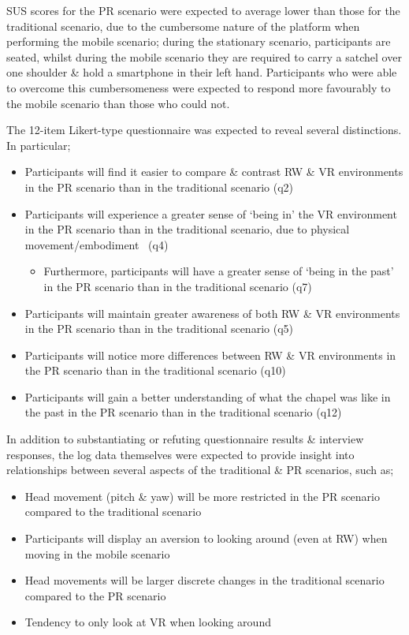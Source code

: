 SUS scores for the PR scenario were expected to average lower than those for the traditional scenario, due to the cumbersome nature of the platform when performing the mobile scenario; during the stationary scenario, participants are seated, whilst during the mobile scenario they are required to carry a satchel over one shoulder \& hold a smartphone in their left hand. Participants who were able to overcome this cumbersomeness were expected to respond more favourably to the mobile scenario than those who could not.

The 12-item Likert-type questionnaire was expected to reveal several distinctions. In particular;
\begin{itemize}
	\item Participants will find it easier to compare \& contrast RW \& VR environments in the PR scenario than in the traditional scenario (q2)
	\item Participants will experience a greater  sense of `being in' the VR environment in the PR scenario than in the traditional scenario, due to physical movement/embodiment~\cite{Groten2011} (q4)
	\begin{itemize}
		\item Furthermore, participants will have a greater sense of `being in the past' in the PR scenario than in the traditional scenario (q7)
	\end{itemize}
	\item Participants will maintain greater awareness of both RW \& VR environments in the PR scenario than in the traditional scenario (q5)
	\item Participants will notice more differences between RW \& VR environments in the PR scenario than in the traditional scenario (q10)	
	\item Participants will gain a better understanding of what the chapel was like in the past in the PR scenario than in the traditional scenario (q12)
\end{itemize}

In addition to substantiating or refuting questionnaire results \& interview responses, the log data themselves were expected to provide insight into relationships between several aspects of the traditional \& PR scenarios, such as;
\begin{itemize}
	\item Head movement (pitch \& yaw) will be more restricted in the PR scenario compared to the traditional scenario
	\item Participants will display an aversion to looking around (even at RW) when moving in the mobile scenario
	\item Head movements will be larger discrete changes in the traditional scenario compared to the PR scenario
	\item Tendency to only look at VR when looking around
\end{itemize}

